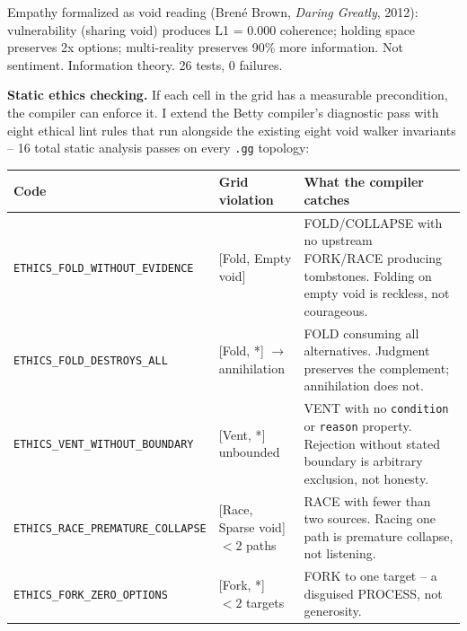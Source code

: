 \documentclass[
  11pt,
]{article}
\newcounter{none} %
\begin{document}
Empathy formalized as void reading (Brené Brown, \emph{Daring Greatly},
2012): vulnerability (sharing void) produces L1 = 0.000 coherence;
holding space preserves 2x options; multi-reality preserves 90\% more
information. Not sentiment. Information theory. 26 tests, 0 failures.

\textbf{Static ethics checking.} If each cell in the grid has a
measurable precondition, the compiler can enforce it. I extend the Betty
compiler's diagnostic pass with eight ethical lint rules that run
alongside the existing eight void walker invariants -- 16 total static
analysis passes on every \texttt{.gg} topology:

{\def\LTcaptype{none} %
\begin{longtable}[]{@{}
  >{\raggedright\arraybackslash}p{}
  >{\raggedright\arraybackslash}p{}
  >{\raggedright\arraybackslash}p{}@{}}
\toprule\noalign{}
\begin{minipage}[b]{\linewidth}\raggedright
Code
\end{minipage} & \begin{minipage}[b]{\linewidth}\raggedright
Grid violation
\end{minipage} & \begin{minipage}[b]{\linewidth}\raggedright
What the compiler catches
\end{minipage} \\
\midrule\noalign{}
\endhead
\bottomrule\noalign{}
\endlastfoot
\texttt{ETHICS\_FOLD\_WITHOUT\_EVIDENCE} & {[}Fold, Empty void{]} &
FOLD/COLLAPSE with no upstream FORK/RACE producing tombstones. Folding
on empty void is reckless, not courageous. \\
\texttt{ETHICS\_FOLD\_DESTROYS\_ALL} & {[}Fold, *{]} \(\to\)
annihilation & FOLD consuming all alternatives. Judgment preserves the
complement; annihilation does not. \\
\texttt{ETHICS\_VENT\_WITHOUT\_BOUNDARY} & {[}Vent, *{]} unbounded &
VENT with no \texttt{condition} or \texttt{reason} property. Rejection
without stated boundary is arbitrary exclusion, not honesty. \\
\texttt{ETHICS\_RACE\_PREMATURE\_COLLAPSE} & {[}Race, Sparse void{]}
\(< 2\) paths & RACE with fewer than two sources. Racing one path is
premature collapse, not listening. \\
\texttt{ETHICS\_FORK\_ZERO\_OPTIONS} & {[}Fork, *{]} \(< 2\) targets &
FORK to one target -- a disguised PROCESS, not generosity. \\

\end{longtable}}
\end{document}
